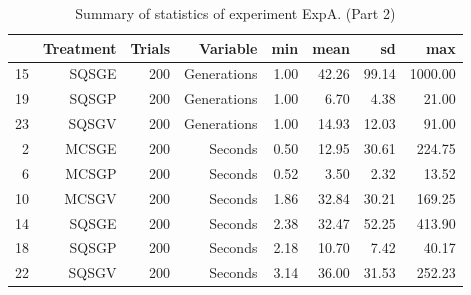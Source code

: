 \begin{table}[ht]
\centering
\begin{tabular}{rrrrrrrr}
  \hline
 & Treatment & Trials & Variable & min & mean & sd & max \\ 
  \hline
15 & SQSGE & 200 & Generations & 1.00 & 42.26 & 99.14 & 1000.00 \\ 
  19 & SQSGP & 200 & Generations & 1.00 & 6.70 & 4.38 & 21.00 \\ 
  23 & SQSGV & 200 & Generations & 1.00 & 14.93 & 12.03 & 91.00 \\ 
  2 & MCSGE & 200 & Seconds & 0.50 & 12.95 & 30.61 & 224.75 \\ 
  6 & MCSGP & 200 & Seconds & 0.52 & 3.50 & 2.32 & 13.52 \\ 
  10 & MCSGV & 200 & Seconds & 1.86 & 32.84 & 30.21 & 169.25 \\ 
  14 & SQSGE & 200 & Seconds & 2.38 & 32.47 & 52.25 & 413.90 \\ 
  18 & SQSGP & 200 & Seconds & 2.18 & 10.70 & 7.42 & 40.17 \\ 
  22 & SQSGV & 200 & Seconds & 3.14 & 36.00 & 31.53 & 252.23 \\ 
   \hline
\end{tabular}
\caption{Summary of statistics of experiment ExpA. (Part 2)} 
\end{table}
